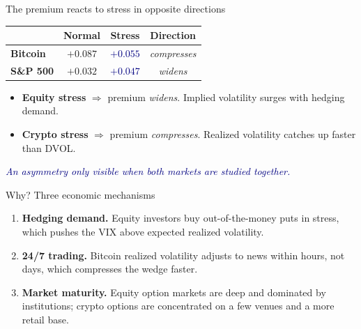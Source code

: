 \documentclass[aspectratio=169,11pt]{beamer}
\begin{document}
\begin{frame}{The premium reacts to stress in opposite directions}
  \vspace*{4mm}
  \begin{center}
    \small
    \renewcommand{\arraystretch}{1.3}
    \begin{tabular}{lccc}
      \toprule
      & \textbf{Normal} & \textbf{Stress} & \textbf{Direction} \\
      \midrule
      \textbf{Bitcoin}        & $+0.087$ & \textcolor{navy}{\textbf{$+0.055$}} & \textit{compresses} \\
      \textbf{S\&P 500}       & $+0.032$ & \textcolor{navy}{\textbf{$+0.047$}} & \textit{widens} \\
      \bottomrule
    \end{tabular}
  \end{center}
  \vspace*{5mm}
  \begin{itemize}
    \item \textbf{Equity stress} $\Rightarrow$ premium \textit{widens}. Implied volatility surges with hedging demand.
    \item \textbf{Crypto stress} $\Rightarrow$ premium \textit{compresses}. Realized volatility catches up faster than DVOL.
  \end{itemize}
  \vspace*{3mm}
  \begin{center}
    \textcolor{navy}{\itshape An asymmetry only visible when both markets are studied together.}
  \end{center}
\end{frame}

\begin{frame}{Why? Three economic mechanisms}
  \vspace*{3mm}
  \begin{enumerate}
    \setlength\itemsep{4mm}
    \item \textbf{Hedging demand.} Equity investors buy out-of-the-money puts in stress, which pushes the VIX above expected realized volatility.
    \item \textbf{24/7 trading.} Bitcoin realized volatility adjusts to news within hours, not days, which compresses the wedge faster.
    \item \textbf{Market maturity.} Equity option markets are deep and dominated by institutions; crypto options are concentrated on a few venues and a more retail base.
  \end{enumerate}
\end{frame}
\end{document}
